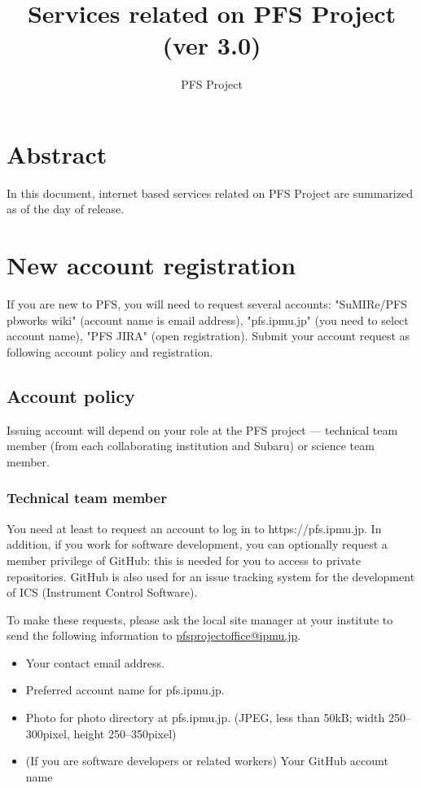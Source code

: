 \documentclass[a4paper,notitlepage]{article}
\title{Services related on PFS Project (ver 3.0)}
\author{PFS Project}
\begin{document}
\maketitle
\tableofcontents

\section{Abstract}

In this document, internet based services related on PFS Project are summarized 
as of the day of release. 

\section{New account registration}

If you are new to PFS, you will need to request several accounts: 
"SuMIRe/PFS pbworks wiki" (account name is email address), 
"pfs.ipmu.jp" (you need to select account name), 
"PFS JIRA" (open registration). 
Submit your account request as following account policy and registration. 

\subsection{Account policy}

Issuing account will depend on your role at the PFS project --- 
technical team member (from each collaborating institution and Subaru) 
or science team member. 

\subsubsection{Technical team member}

You need at least to request an account to log in to https://pfs.ipmu.jp.
In addition, if you work for software development, you can optionally 
request a member privilege of GitHub: this is needed for you to access 
to private repositories. 
GitHub is also used for an issue tracking system for the development of 
ICS (Instrument Control Software).

To make these requests, please ask the local site manager at your institute 
to send the following information to \url{pfsprojectoffice@ipmu.jp}. 

\begin{itemize}
  \item Your contact email address.
  \item Preferred account name for pfs.ipmu.jp.
  \item Photo for photo directory at pfs.ipmu.jp. (JPEG, less than 50kB; width 
    250--300pixel, height 250--350pixel)
  \item (If you are software developers or related workers) Your GitHub account name
\end{itemize}
\end{document}
